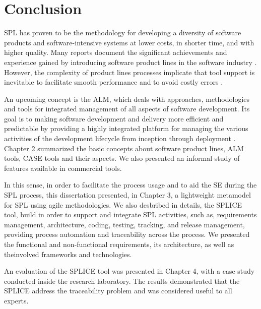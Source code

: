 \chapter{Conclusion}
\label{ch:conclusion}

\acf{SPL} has proven to be the methodology for developing a diversity of software products and software-intensive systems at lower costs, in shorter time, and with higher quality. Many reports document the significant achievements and experience gained by introducing software product lines in the software industry \citep{Pohl2005}. However, the complexity of product lines processes implicate that tool support is inevitable to facilitate smooth performance and to avoid costly errors \citep{Dhungana2007}. 

An upcoming concept is the \acf{ALM}, which deals with approaches, methodologies and tools for integrated management of all aspects of software development. Its goal is to making software development and delivery more efficient and predictable by providing a highly integrated platform for managing the various activities of the development lifecycle from inception through deployment \citep{kaariainen2011towards}. Chapter 2 summarized the basic concepts about software product lines, \ac{ALM} tools, \ac{CASE} tools and their aspects. We also presented an informal study of features available in commercial tools.

In this sense, in order to facilitate the process usage and to aid the \acf{SE} during the \ac{SPL} process, this dissertation presented, in Chapter 3, a lightweight metamodel for \ac{SPL} using agile methodologies. We also desbribed in details, the \acf{SPLICE} tool, build in order to support and integrate \ac{SPL} activities, such as, requirements management, architecture, coding, testing, tracking, and release management, providing process automation and traceability across the process. We presented the functional and non-functional requirements, its architecture, as well as theinvolved frameworks and technologies.

An evaluation of the \ac{SPLICE} tool was presented in Chapter 4, with a case study conducted inside the research laboratory. The results demonstrated that the \ac{SPLICE} address the traceability problem and was considered useful to all experts.

